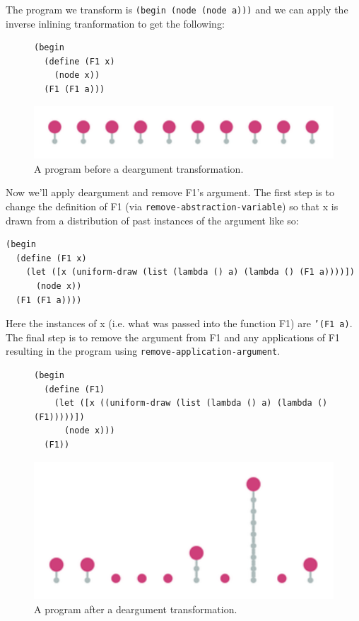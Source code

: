 \documentclass[a4paper,10pt]{article}
\begin{document}
The program we transform is \texttt{(begin (node (node a)))} and we can apply the inverse inlining tranformation to get the following:
\begin{figure}[htbp]
\begin{center}
\begin{verbatim}
(begin
  (define (F1 x)
    (node x))
  (F1 (F1 a)))
\end{verbatim}
\includegraphics[scale=.25]{recBef.pdf}
\end{center}
\label{prog:recBef}
\caption{A program before a deargument transformation.}
\end{figure}
Now we'll apply deargument and remove F1's argument.  The first step is to change the definition of F1 (via \texttt{remove-abstraction-variable}) so that x is drawn from a distribution of past instances of the argument like so:
\begin{verbatim}
(begin
  (define (F1 x)
    (let ([x (uniform-draw (list (lambda () a) (lambda () (F1 a))))])
      (node x))
  (F1 (F1 a))))
\end{verbatim}
Here the instances of x (i.e. what was passed into the function F1) are \texttt{'(F1 a)}.   The final step is to remove the argument from F1 and any applications of F1 resulting in the program using \texttt{remove-application-argument}.
\begin{figure}[htbp]
\begin{center}
\begin{verbatim}
(begin
  (define (F1)
    (let ([x ((uniform-draw (list (lambda () a) (lambda () (F1)))))])
      (node x)))
  (F1))
\end{verbatim}
\includegraphics[scale=.25]{recAft.pdf}
\end{center}
\label{prog:recAft}
\caption{A program after a deargument transformation.}
\end{figure}
\end{document}
